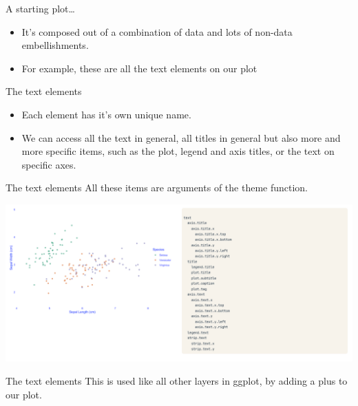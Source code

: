 \documentclass[
  ignorenonframetext,
]{beamer}
\begin{document}
\begin{frame}{A starting plot\ldots{}}
\label{a-starting-plot-1}
\begin{itemize}
\item
  It's composed out of a combination of data and lots of non-data
  embellishments.
\item
  For example, these are all the text elements on our plot
\end{itemize}
\end{frame}

\begin{frame}{The text elements}
\label{the-text-elements}
\begin{itemize}
\item
  Each element has it's own unique name.
\item
  We can access all the text in general, all titles in general but also
  more and more specific items, such as the plot, legend and axis
  titles, or the text on specific axes.
\end{itemize}
\end{frame}

\begin{frame}{The text elements}
\label{the-text-elements-1}
All these items are arguments of the theme function.

\includegraphics{../images/im212.png}
\end{frame}

\begin{frame}{The text elements}
\label{the-text-elements-2}
This is used like all other layers in ggplot, by adding a plus to our
plot.
\end{frame}
\end{document}
